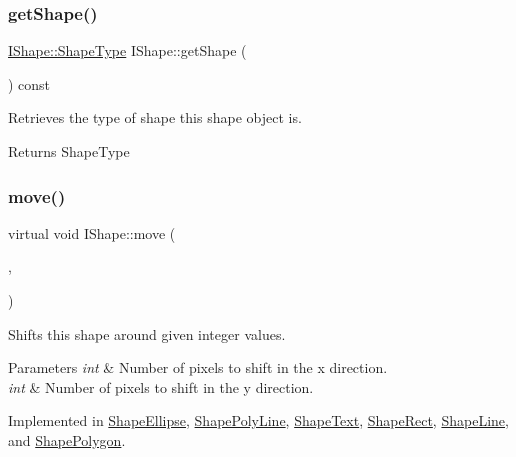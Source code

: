 \mbox{\label{class_i_shape_a92764c3d0b0d12f0f1296cf1e3a392a8}} 
\subsubsection{\texorpdfstring{getShape()}{getShape()}}
{\footnotesize\ttfamily \mbox{\hyperlink{class_i_shape_a8f50993477b5ddb44c0547ef3d547cdc}{I\+Shape\+::\+Shape\+Type}} I\+Shape\+::get\+Shape (\begin{DoxyParamCaption}{ }\end{DoxyParamCaption}) const}



Retrieves the type of shape this shape object is. 

\begin{DoxyReturn}{Returns}
Shape\+Type 
\end{DoxyReturn}
\mbox{\label{class_i_shape_a3d23494cd34e658cc6b39a2e2db0b7fe}} 
\subsubsection{\texorpdfstring{move()}{move()}}
{\footnotesize\ttfamily virtual void I\+Shape\+::move (\begin{DoxyParamCaption}\item[{int}]{,  }\item[{int}]{ }\end{DoxyParamCaption})\hspace{0.3cm}{\ttfamily [pure virtual]}}



Shifts this shape around given integer values. 


\begin{DoxyParams}{Parameters}
{\em int} & Number of pixels to shift in the x direction. \\
\hline
{\em int} & Number of pixels to shift in the y direction. \\
\hline
\end{DoxyParams}


Implemented in \mbox{\hyperlink{class_shape_ellipse_a07ce6783744d01ccebbd5c2c8b4c7d9b}{Shape\+Ellipse}}, \mbox{\hyperlink{class_shape_poly_line_a7c1971596b171c4c08ec5657b6592354}{Shape\+Poly\+Line}}, \mbox{\hyperlink{class_shape_text_ae7b73f317077c9873f4bd59c98b89c60}{Shape\+Text}}, \mbox{\hyperlink{class_shape_rect_a79fcc5998d54d1bfd851646479804b32}{Shape\+Rect}}, \mbox{\hyperlink{class_shape_line_a5b6d9bcf7ed64ab2454d5efa66486ee9}{Shape\+Line}}, and \mbox{\hyperlink{class_shape_polygon_a1f67f660d14090b21c00e2892f764451}{Shape\+Polygon}}.


